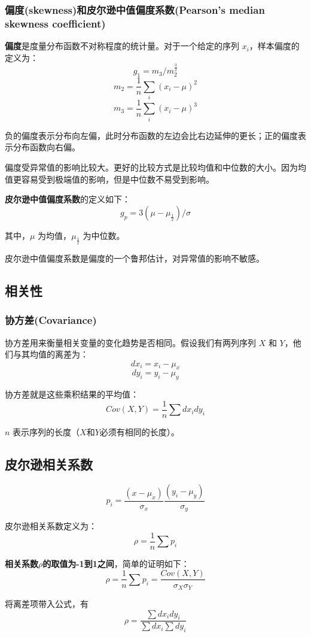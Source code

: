 \documentclass[12pt]{article}
\begin{document}
\subsubsection{偏度(skewness)和皮尔逊中值偏度系数(Pearson's median skewness coefficient)\cite{Think_Stats}}
\textbf{偏度}是度量分布函数不对称程度的统计量。对于一个给定的序列 $x_i$，样本偏度的定义为：
$$
g_1 = m_3 / m_2^{\frac{3}{2}}
$$
$$
m_2 = \frac{1}{n}\sum_i(x_i - \mu)^2
$$
$$
m_3 = \frac{1}{n}\sum_i(x_i - \mu)^3
$$

负的偏度表示分布向左偏，此时分布函数的左边会比右边延伸的更长；正的偏度表示分布函数向右偏。

偏度受异常值的影响比较大。更好的比较方式是比较均值和中位数的大小。因为均值更容易受到极端值的影响，但是中位数不易受到影响。

\textbf{皮尔逊中值偏度系数}的定义如下：
$$
g_p = 3(\mu - \mu_{\frac{1}{2}})/\sigma
$$

其中，$\mu$ 为均值，$\mu_{\frac{1}{2}}$ 为中位数。

皮尔逊中值偏度系数是偏度的一个鲁邦估计，对异常值的影响不敏感。

\subsection{相关性}
\subsubsection{协方差(Covariance)\cite{Think_Stats}}
协方差用来衡量相关变量的变化趋势是否相同。假设我们有两列序列 $X$ 和 $Y$，他们与其均值的离差为：
$$
dx_i = x_i - \mu_x 
$$
$$
dy_i = y_i - \mu_y
$$

协方差就是这些乘积结果的平均值：
$$
Cov(X,Y) = \frac{1}{n}\sum{dx_idy_i}
$$

$n$ 表示序列的长度（$X$和$Y$必须有相同的长度）。

\subsection{皮尔逊相关系数}
$$
p_i = \frac{(x-\mu_x)}{\sigma_x}\frac{(y_i-\mu_y)}{\sigma_y}
$$

皮尔逊相关系数定义为：
$$
\rho = \frac{1}{n}\sum{p_i}
$$

\textbf{相关系数$\rho$的取值为-1到1之间}，简单的证明如下：
$$
\rho = \frac{1}{n}\sum{p_i} = \frac{Cov(X,Y)}{\sigma_X\sigma_Y}
$$

将离差项带入公式，有
$$
\rho = \frac{\sum dx_idy_i}{\sum{dx_i}\sum{dy_i}}
$$
\end{document}
